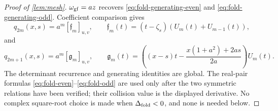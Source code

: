 \documentclass[review,hidelinks,onefignum,onetabnum]{siamart251216}
\begin{document}
\begin{proof}[Proof of \cref{lem:mesh}]
\(\omega_{\rm gf}=az\) recovers
\eqref{eq:fold-generating-even} and \eqref{eq:fold-generating-odd}.
Coefficient comparison gives
\begin{equation}\label{eq:fold-even}
 q_{2m}(x,s)=a^m[\mathfrak f_m]_{u,v},\qquad
 \mathfrak f_m(t)=(t-\zeta_s)(U_m(t)+U_{m-1}(t)),
\end{equation}
and
\begin{equation}\label{eq:fold-odd}
 q_{2m+1}(x,s)=a^m[\mathfrak g_m]_{u,v},\qquad
 \mathfrak g_m(t)=\left((x-s)t-
 \frac{x(1+a^2)+2as}{2a}\right)U_m(t).
\end{equation}
The determinant recurrence and generating identities are global.  The
real-pair formulas \eqref{eq:fold-even}--\eqref{eq:fold-odd} are used
only after the two symmetric relations have been verified; their
collision value is the displayed derivative.  No complex square-root
choice is made when \(\Delta_{\rm fold}<0\), and none is needed below.


\end{proof}
\end{document}
